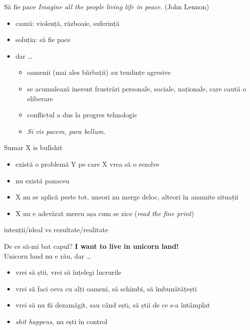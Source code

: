 \documentclass{simple}
\begin{document}
\begin{frame}{Să fie pace}
  \textit{Imagine all the people living life in peace.} (John Lennon) \\
  \begin{itemize}
    \pause \item cauză: violență, războaie, suferință
    \pause \item soluția: să fie pace
    \pause \item dar \ldots
      \begin{itemize}
        \pause \item oamenii (mai ales bărbații) au tendințe agresive
        \pause \item se acumulează inerent frustrări personale, sociale, naționale, care caută o eliberare
        \pause \item conflictul a dus la progres tehnologic
        \pause \item \textit{Si vis pacem, para bellum.}
      \end{itemize}
  \end{itemize}
\end{frame}

\begin{frame}{Sumar}
  \pause X is bullshit
  \begin{itemize}
    \pause \item există o problemă Y pe care X vrea să o rezolve
    \pause \item nu există panaceu
    \pause \item X nu se aplică peste tot, uneori nu merge deloc, alteori în anumite situații
    \pause \item X nu e adevărat mereu așa cum se zice (\textit{read the fine print})
  \end{itemize}
  \pause intenții/ideal vs rezultate/realitate
\end{frame}

\begin{frame}{De ce să-mi bat capul?}
  \pause \textbf{I want to live in unicorn land!}\\
  \vspace{1cm}
  \pause Unicorn land nu e rău, dar \ldots
  \begin{itemize}
    \pause \item vrei să știi, vrei să înțelegi lucrurile
    \pause \item vrei să faci ceva cu alți oameni, să schimbi, să îmbunătățești
    \pause \item vrei să nu fii dezamăgit, sau când ești, să știi de ce s-a întâmplat
    \pause \item \textit{shit happens}, nu ești în control
  \end{itemize}
\end{frame}
\end{document}
